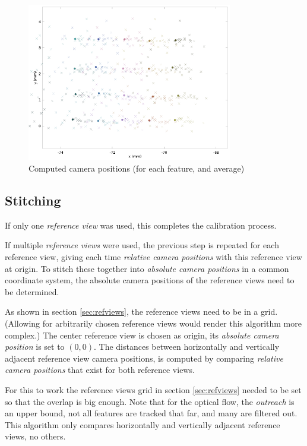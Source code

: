 \documentclass{scrreprt}
\begin{document}
\begin{figure}
\centering
\includegraphics[width=0.8\textwidth]{rcpos.png}
\caption{Computed camera positions (for each feature, and average)}
\label{fig:rcpositions}
\end{figure}



\subsection{Stitching}
If only one \emph{reference view} was used, this completes the calibration process.

If multiple \emph{reference views} were used, the previous step is repeated for each reference view, giving each time \emph{relative camera positions} with this reference view at origin. To stitch these together into \emph{absolute camera positions} in a common coordinate system, the absolute camera positions of the reference views need to be determined.

As shown in section \ref{sec:refviews}, the reference views need to be in a grid. (Allowing for arbitrarily chosen reference views would render this algorithm more complex.) The center reference view is chosen as origin, its \emph{absolute camera position} is set to $(0,0)$. The distances between horizontally and vertically adjacent reference view camera positions, is computed by comparing \emph{relative camera positions} that exist for both reference views.

For this to work the reference views grid in section \ref{sec:refviews} needed to be set so that the overlap is big enough. Note that for the optical flow, the \emph{outreach} is an upper bound, not all features are tracked that far, and many are filtered out. This algorithm only compares horizontally and vertically adjacent reference views, no others.
\end{document}
